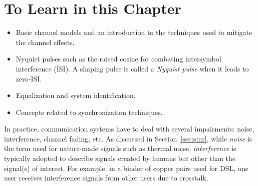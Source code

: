 \section{To Learn in this Chapter}

\begin{itemize}
\item Basic channel models and an introduction to the techniques used to mitigate the channel effects.
\item Nyquist pulses such as the raised cosine for combating intersymbol interference (ISI). A shaping pulse is called a \emph{Nyquist pulse} when it leads to zero-ISI.
\item Equalization and system identification.
\item Concepts related to synchronization techniques.
\end{itemize}



%
%
%
%




In practice, communication systems have to deal with several impairments: noise, interference, channel fading, etc. As discussed in Section~\ref{sec:sinr}, while \emph{noise} is the term used for nature-made signals such as thermal noise, \emph{interference} is typically adopted to describe signals created by humans but other than the signal(s) of interest. For example, in a binder of copper pairs used for DSL, one user receives interference signals from other users due to crosstalk.

